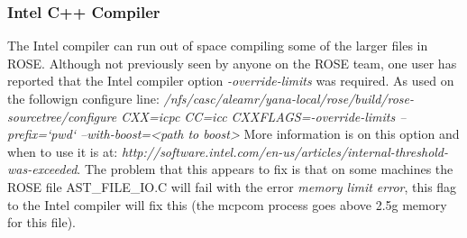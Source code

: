 \subsubsection{Intel C++ Compiler}
The Intel compiler can run out of space compiling some of the larger files in ROSE.
Although not previously seen by anyone on the ROSE team, one user has reported
that the Intel compiler option {\em -override-limits} was required.  As used on
the followign configure line:
{\em /nfs/casc/aleamr/yana-local/rose/build/rose-sourcetree/configure CXX=icpc CC=icc CXXFLAGS=-override-limits --prefix=`pwd` --with-boost=<path to boost>}
More information is on this option and when to use it is at:
{\em http://software.intel.com/en-us/articles/internal-threshold-was-exceeded}.
The problem that this appears to fix is that on some machines the ROSE 
file AST\_FILE\_IO.C will fail with the error {\em memory limit error},
this flag to the Intel compiler will fix this (the mcpcom process goes above 
2.5g memory for this file).
